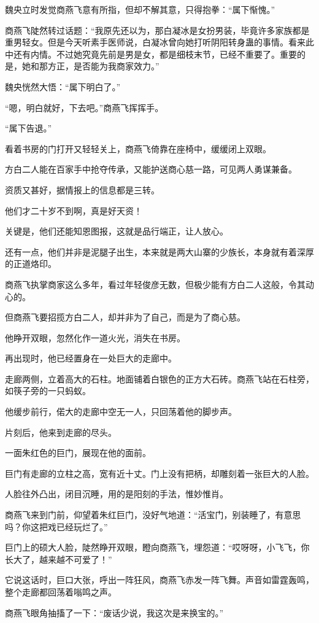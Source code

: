 \begin{this_body}
魏央立时发觉商燕飞意有所指，但却不解其意，只得抱拳：“属下惭愧。”

商燕飞陡然转过话题：“我原先还以为，那白凝冰是女扮男装，毕竟许多家族都是重男轻女。但是今天听素手医师说，白凝冰曾向她打听阴阳转身蛊的事情。看来此中还有内情。不过她究竟先前是男是女，都是细枝末节，已经不重要了。重要的是，她和那方正，是否能为我商家效力。”

魏央恍然大悟：“属下明白了。”

“嗯，明白就好，下去吧。”商燕飞挥挥手。

“属下告退。”

看着书房的门打开又轻轻关上，商燕飞倚靠在座椅中，缓缓闭上双眼。

方白二人能在百家手中抢夺传承，又能护送商心慈一路，可见两人勇谋兼备。

资质又甚好，据情报上的信息都是三转。

他们才二十岁不到啊，真是好天资！

关键是，他们还能知恩图报，这就是品行端正，让人放心。

还有一点，他们并非是泥腿子出生，本来就是两大山寨的少族长，本身就有着深厚的正道烙印。

商燕飞执掌商家这么多年，看过年轻俊彦无数，但极少能有方白二人这般，令其动心的。

但商燕飞要招揽方白二人，却并非为了自己，而是为了商心慈。

他睁开双眼，忽然化作一道火光，消失在书房。

再出现时，他已经置身在一处巨大的走廊中。

走廊两侧，立着高大的石柱。地面铺着白银色的正方大石砖。商燕飞站在石柱旁，如筷子旁的一只蚂蚁。

他缓步前行，偌大的走廊中空无一人，只回荡着他的脚步声。

片刻后，他来到走廊的尽头。

一面朱红色的巨门，展现在他的面前。

巨门有走廊的立柱之高，宽有近十丈。门上没有把柄，却雕刻着一张巨大的人脸。

人脸往外凸出，闭目沉睡，用的是阳刻的手法，惟妙惟肖。

商燕飞来到门前，仰望着朱红巨门，没好气地道：“活宝门，别装睡了，有意思吗？你这把戏已经玩烂了。”

巨门上的硕大人脸，陡然睁开双眼，瞪向商燕飞，埋怨道：“哎呀呀，小飞飞，你长大了，越来越不可爱了！”

它说这话时，巨口大张，呼出一阵狂风，商燕飞赤发一阵飞舞。声音如雷霆轰鸣，整个走廊都回荡着嗡鸣之声。

商燕飞眼角抽搐了一下：“废话少说，我这次是来换宝的。”

\end{this_body}

